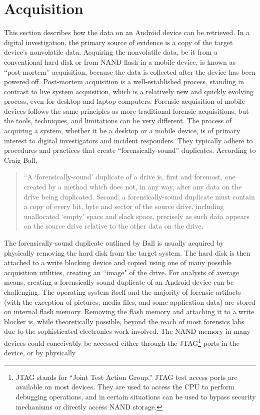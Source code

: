 \section{Acquisition}
This section describes how the data on an Android device can be retrieved.  In a digital investigation, the primary source of
evidence is a copy of the target device's nonvolatile data.  Acquiring the nonvolatile data, be it from a conventional hard disk or
from NAND flash in a mobile device, is known as ``post-mortem'' acquisition, because the data is collected after the device has been
powered off.  Post-mortem acquisition is a well-established process, standing in contrast to live system acquisition, which is a
relatively new and quickly evolving process, even for desktop and laptop computers.  Forensic acquisition of mobile devices follows
the same principles as more traditional forensic acquisitions, but the tools, techniques, and limitations can be very different. The
process of acquiring a system, whether it be a desktop or a mobile device, is of primary interest to digital investigators and
incident responders. They typically adhere to procedures and practices that create ``forensically-sound'' duplicates.  According to
Craig Ball, 
\begin{quote}
“A ‘forensically-sound’ duplicate of a drive is, first and foremost, one created by a method which does not, in any way, alter any
data on the drive being duplicated.  Second, a forensically-sound duplicate must contain a copy of every bit, byte and sector of the
source drive, including unallocated ‘empty’ space and slack space, precisely as such data appears on the source drive relative to
the other data on the drive. 
\cite{ball}
\end{quote}
The forensically-sound duplicate outlined by Ball is usually acquired by physically removing the hard disk from the target system.
The hard disk is then attached to a write blocking device and copied using one of many possible acquisition utilities, creating an
``image" of the drive. For analysts of average means, creating a forensically-sound duplicate of an Android device can be
challenging. The operating system itself and the majority of forensic artifacts (with the exception of pictures, media files, and
some application data) are stored on internal flash memory.  Removing the flash memory and attaching it to a write blocker is, while
theoretically possible, beyond the reach of most forensics labs due to the sophisticated electronics work involved.  The NAND memory in
many devices could conceivably be accessed either through the JTAG\footnote{JTAG stands for ``Joint Test Action Group.'' JTAG test
access ports are available on most devices.  They are used to access the CPU to perform debugging operations, and in certain
situations can be used to bypass security mechanisms or directly access NAND storage.} ports in the device, or by physically
